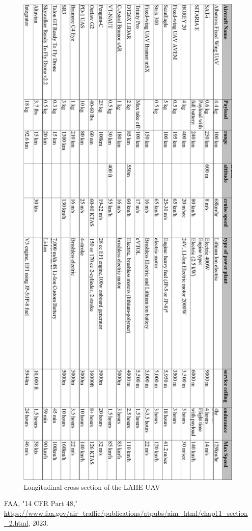 \documentclass[12pt]{article}
\begin{document}
	\begin{figure}[h!]
		\centering
		\includegraphics{Media/Table.png} %
		\caption{Longitudinal cross-section of the LAHE UAV}
	\end{figure}


	
	\newpage
	
	\begin{thebibliography}{9}
		FAA, "14 CFR Part 48," \url{https://www.faa.gov/air_traffic/publications/atpubs/aim_html/chap11_section_2.html}, 2023.
	\end{thebibliography}
	
\end{document}
